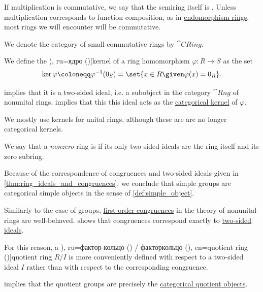 \begin{definition}
\begin{thmenum}
     If multiplication is commutative, we say that the semiring itself is . Unless multiplication corresponds to function composition, as in \hyperref[def:endomorphism_ring]{endomorphism rings}, most rings we will encounter will be commutative.

    We denote the category of small commutative rings by \( \cat{CRing} \).

     We define the \term[bg=ядро (\cite[123]{ГеновМиховскиМоллов1991Алгебра}), ru=ядро (\cite[156]{Кострикин2020АлгебраЧасть1})]{kernel} of a ring homomorphism \( \varphi: R \to S \) as the set
    \begin{equation}\label{eq:def:ring/kernel}
      \ker \varphi \coloneqq \varphi^{-1}(0_S) = \set{ x \in R \given \varphi(x) = 0_R }.
    \end{equation}

     implies that it is a two-sided ideal, i.e. a subobject in the category \( \cat{Rng} \) of nonunital rings.  implies that this this ideal acts as the \hyperref[def:categorical_kernels/kernel]{categorical kernel} of \( \varphi \).

    We mostly use kernels for unital rings, although these are are no longer categorical kernels.

     We say that a \emph{nonzero} ring is  if its only two-sided ideals are the ring itself and its zero subring.

    Because of the correspondence of congruences and two-sided ideals given in \cref{thm:ring_ideals_and_congruences}, we conclude that simple groups are categorical simple objects in the sense of \cref{def:simple_object}.

    \mimprovised Similarly to the case of groups, \hyperref[def:fol_congruence]{first-order congruences} in the theory of nonunital rings are well-behaved.  shows that congruences correspond exactly to \hyperref[def:semiring_ideal]{two-sided ideals}.

    For this reason, a \term[bg=фактор-пръстен (\cite[121]{ГеновМиховскиМоллов1991Алгебра}), ru=фактор-кольцо (\cite[337]{Тыртышников2017ОсновыАлгебры}) / факторкольцо (\cite[387]{Винберг2014КурсАлгебры}), en=quotient ring (\cite[101]{Jacobson1985BasicAlgebraI})]{quotient ring} \( R / I \) is more conveniently defined with respect to a two-sided ideal \( I \) rather than with respect to the corresponding congruence.

     implies that the quotient groups are precisely the \hyperref[def:categorical_quotient_object]{categorical quotient objects}.
  \end{thmenum}
\end{definition}
